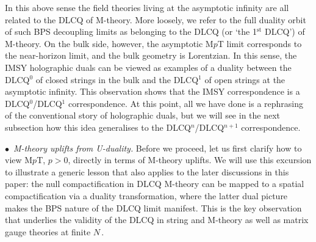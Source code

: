 \documentclass[11pt]{article}
\renewcommand{\emph}[1]{\textit{#1}}
\begin{document}
In this above sense the field theories living at the asymptotic infinity are all related to the DLCQ of M-theory. More loosely, we refer to the full duality orbit of such BPS decoupling limits as belonging to the DLCQ (or `the 1${}^\text{st}$ DLCQ') of M-theory. On the bulk side, however, the asymptotic M$p$T limit corresponds to the near-horizon limit, and the bulk geometry is Lorentzian. In this sense, the IMSY holographic duals can be viewed as examples of a duality between the DLCQ${}^0$ of closed strings in the bulk and the DLCQ${}^1$ of open strings at the asymptotic infinity. This observation shows that the IMSY correspondence is a DLCQ${}^0$/DLCQ${}^1$ correspondence. At this point, all we have done is a rephrasing of the conventional story of holographic duals, but we will see in the next subsection how this idea generalises to the DLCQ${}^n$/DLCQ${}^{n+1}$ correspondence. 

\vspace{3mm}

\noindent $\bullet$~\emph{M-theory uplifts from U-duality.} Before we proceed, let us first clarify how to view M$p$T, $p>0$, directly in terms of M-theory uplifts. 
We will use this excursion to illustrate a generic lesson that also applies to the later discussions in this paper: the null compactification in DLCQ M-theory can be mapped to a spatial compactification via a duality transformation, where the latter dual picture makes the BPS nature of the DLCQ limit manifest. This is the key observation that underlies the validity of the DLCQ in string and M-theory as well as matrix gauge theories at finite $N$\,. 
\end{document}

